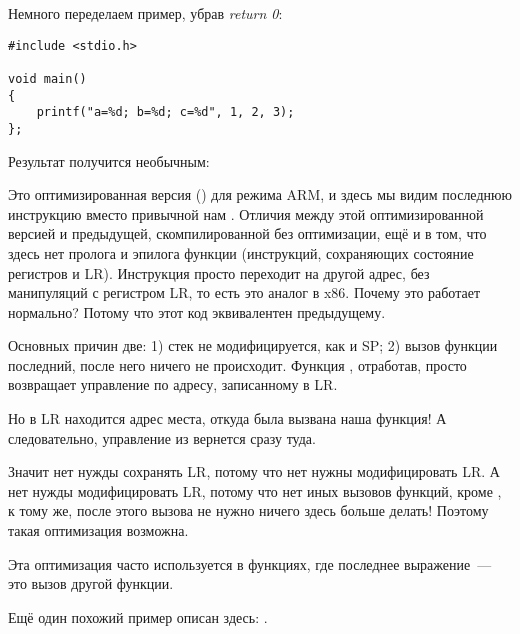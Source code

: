 Немного переделаем пример, убрав \emph{return 0}:

\begin{lstlisting}[style=customc]
#include <stdio.h>

void main()
{
	printf("a=%d; b=%d; c=%d", 1, 2, 3);
};
\end{lstlisting}

Результат получится необычным:



Это оптимизированная версия (\Othree) для режима ARM, и здесь мы видим последнюю инструкцию 
 вместо привычной нам .
Отличия между этой оптимизированной версией и предыдущей, скомпилированной без оптимизации, 
ещё и в том, что здесь нет пролога и эпилога функции (инструкций, сохраняющих состояние регистров  и \ac{LR}).
Инструкция  просто переходит на другой адрес, без манипуляций с регистром \ac{LR}, то есть это аналог \JMP в x86.
Почему это работает нормально? Потому что этот код эквивалентен предыдущему.

Основных причин две: 1) стек не модифицируется, как и  \ac{SP}; 2) вызов функции \printf последний, после него ничего не происходит.
Функция \printf, отработав, просто возвращает управление по адресу, записанному в \ac{LR}.

Но в \ac{LR} находится адрес места, откуда была вызвана наша функция!
А следовательно, управление из \printf вернется сразу туда.

Значит нет нужды сохранять \ac{LR}, потому что нет нужны модифицировать \ac{LR}.
А нет нужды модифицировать \ac{LR}, потому что нет иных вызовов функций, кроме \printf, к тому же, после этого вызова не нужно ничего здесь больше делать!
Поэтому такая оптимизация возможна.

Эта оптимизация часто используется в функциях, где последнее выражение~--- это вызов другой функции.

Ещё один похожий пример описан здесь:
.




